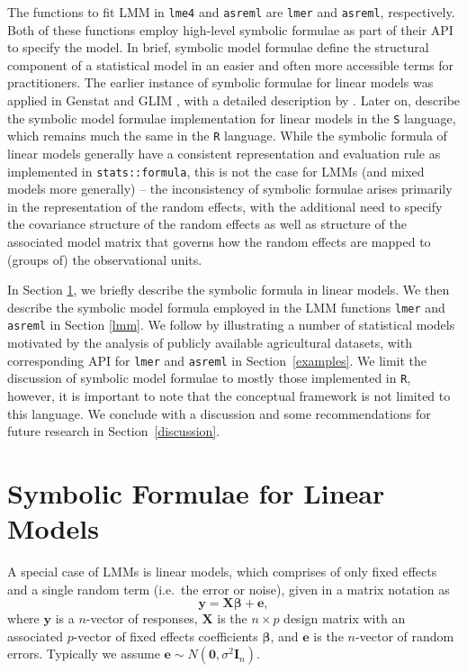 \documentclass[runningheads]{llncs}\usepackage[]{graphicx}\usepackage[]{color}
\begin{document}
The functions to fit LMM in \texttt{lme4} and \texttt{asreml} are \texttt{lmer} and \texttt{asreml}, respectively. Both of these functions employ high-level symbolic formulae as part of their API to specify the model. In brief, symbolic model formulae define the structural component of a statistical model in an easier and often more accessible terms for practitioners. The earlier instance of symbolic formulae for linear models was applied in Genstat \citep{genstat} and GLIM \citep{GLIM}, with a detailed description by \citet{Wilkinson1973}. Later on, \citet{Chambers1993} describe the symbolic model formulae implementation for linear models in the \texttt{S} language, which remains much the same in the \texttt{R} language. While the symbolic formula of linear models generally have a consistent representation and evaluation rule as implemented in \texttt{stats::formula}, this is not the case for LMMs (and mixed models more generally) -- the inconsistency of symbolic formulae arises primarily in the representation of the random effects, with the additional need to specify the covariance structure of the random effects as well as structure of the associated model matrix that governs how the random effects are mapped to (groups of) the observational units.


In Section \ref{lm}, we briefly describe the symbolic formula in linear models. We then describe the symbolic model formula employed in the LMM functions \texttt{lmer} and \texttt{asreml} in Section \ref{lmm}. We follow by illustrating a number of statistical models motivated by the analysis of publicly available agricultural datasets, with corresponding API for \texttt{lmer} and \texttt{asreml} in Section~\ref{examples}.  We limit the discussion of symbolic model formulae to mostly those implemented in \texttt{R}, however, it is important to note that the conceptual framework is not limited to this language. We conclude with a discussion and some recommendations for future research in Section~\ref{discussion}. 



\hypertarget{lm}{%
	\section{Symbolic Formulae for Linear Models}\label{lm}}

A special case of LMMs is linear models, which comprises of only fixed effects and a single random term (i.e.~the error or noise), given in a matrix notation as
\begin{equation}
\boldsymbol{y} = \mathbf{X}\boldsymbol{\beta} + \boldsymbol{e},\label{eq:lm}
\end{equation}
where \(\boldsymbol{y}\) is a \(n\)-vector of responses, \(\mathbf{X}\) is the \(n\times p\) design matrix with an associated \(p\)-vector of fixed effects coefficients \(\boldsymbol{\beta}\), and \(\boldsymbol{e}\) is the \(n\)-vector of random errors. Typically we assume \(\boldsymbol{e} \sim N(\boldsymbol{0}, \sigma^2\mathbf{I}_n)\).
\end{document}
